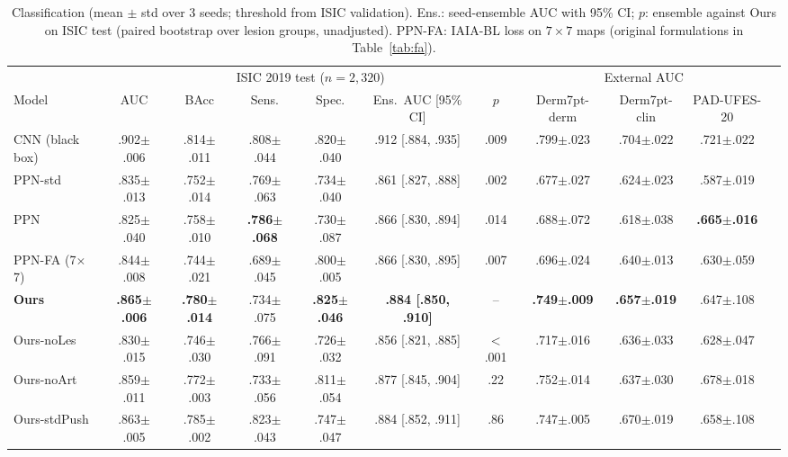 \documentclass[conference]{IEEEtran}
\begin{document}
\begin{table}[t]
\caption{Classification (mean $\pm$ std over 3 seeds; threshold from ISIC validation). Ens.: seed-ensemble AUC with 95\% CI; $p$: ensemble against Ours on ISIC test (paired bootstrap over lesion groups, unadjusted). PPN-FA: IAIA-BL loss on $7\times7$ maps (original formulations in Table~\ref{tab:fa}).}
\label{tab:cls}
\centering
\footnotesize
\setlength{\tabcolsep}{3.4pt}
\begin{tabular}{lcccccccccc}
\toprule
& \multicolumn{6}{c}{ISIC 2019 test ($n=2{,}320$)} & \multicolumn{3}{c}{External AUC} \\
\cmidrule(lr){2-7}\cmidrule(lr){8-10}
Model & AUC & BAcc & Sens. & Spec. & Ens.\ AUC [95\% CI] & $p$ & Derm7pt-derm & Derm7pt-clin & PAD-UFES-20 \\
\midrule
CNN (black box) & .902$\pm$.006 & .814$\pm$.011 & .808$\pm$.044 & .820$\pm$.040 & .912 [.884, .935] & .009 & .799$\pm$.023 & .704$\pm$.022 & .721$\pm$.022 \\
\midrule
PPN-std & .835$\pm$.013 & .752$\pm$.014 & .769$\pm$.063 & .734$\pm$.040 & .861 [.827, .888] & .002 & .677$\pm$.027 & .624$\pm$.023 & .587$\pm$.019 \\
PPN & .825$\pm$.040 & .758$\pm$.010 & \textbf{.786$\pm$.068} & .730$\pm$.087 & .866 [.830, .894] & .014 & .688$\pm$.072 & .618$\pm$.038 & \textbf{.665$\pm$.016} \\
PPN-FA (7$\times$7) & .844$\pm$.008 & .744$\pm$.021 & .689$\pm$.045 & .800$\pm$.005 & .866 [.830, .895] & .007 & .696$\pm$.024 & .640$\pm$.013 & .630$\pm$.059 \\
\textbf{Ours} & \textbf{.865$\pm$.006} & \textbf{.780$\pm$.014} & .734$\pm$.075 & \textbf{.825$\pm$.046} & \textbf{.884 [.850, .910]} & -- & \textbf{.749$\pm$.009} & \textbf{.657$\pm$.019} & .647$\pm$.108 \\
\midrule
Ours-noLes & .830$\pm$.015 & .746$\pm$.030 & .766$\pm$.091 & .726$\pm$.032 & .856 [.821, .885] & $<$.001 & .717$\pm$.016 & .636$\pm$.033 & .628$\pm$.047 \\
Ours-noArt & .859$\pm$.011 & .772$\pm$.003 & .733$\pm$.056 & .811$\pm$.054 & .877 [.845, .904] & .22 & .752$\pm$.014 & .637$\pm$.030 & .678$\pm$.018 \\
Ours-stdPush & .863$\pm$.005 & .785$\pm$.002 & .823$\pm$.043 & .747$\pm$.047 & .884 [.852, .911] & .86 & .747$\pm$.005 & .670$\pm$.019 & .658$\pm$.108 \\
\bottomrule
\end{tabular}
\end{table}
\end{document}
